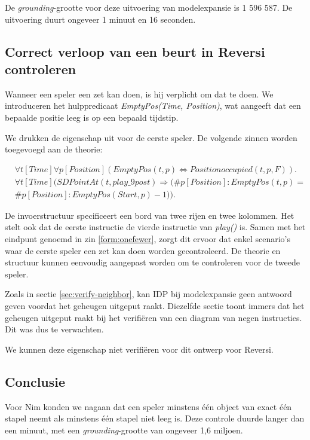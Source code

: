 De \textit{grounding}-grootte voor deze uitvoering van modelexpansie is 1 596 587. De uitvoering duurt ongeveer 1 minuut en 16 seconden. 

\subsection{Correct verloop van een beurt in Reversi controleren}

Wanneer een speler een zet kan doen, is hij verplicht om dat te doen. We introduceren het hulppredicaat \textit{EmptyPos(Time, Position)}, wat aangeeft dat een bepaalde positie leeg is op een bepaald tijdstip.

We drukken de eigenschap uit voor de eerste speler. De volgende zinnen worden toegevoegd aan de theorie:

\begin{align}
	&\forall{t}[Time]\forall{p}[Position](EmptyPos(t, p) \Leftrightarrow Positionoccupied(t, p, F)).\label{form:emptypos} \\
	\nonumber &\forall{t}[Time](SDPointAt(t, play\_9post) \Rightarrow (\#{p [Position] : EmptyPos(t, p)} = \\ &\#{p [Position] : EmptyPos(Start, p)} - 1)).\label{form:onefewer}
\end{align}

De invoerstructuur specificeert een bord van twee rijen en twee kolommen. Het stelt ook dat de eerste instructie de vierde instructie van \textit{play()} is. Samen met het eindpunt genoemd in zin \ref{form:onefewer}, zorgt dit ervoor dat enkel scenario's waar de eerste speler een zet kan doen worden gecontroleerd. De theorie en structuur kunnen eenvoudig aangepast worden om te controleren voor de tweede speler.

Zoals in sectie \ref{sec:verify-neighbor}, kan IDP bij modelexpansie geen antwoord geven voordat het geheugen uitgeput raakt. Diezelfde sectie toont immers dat het geheugen uitgeput raakt bij het verifi\"eren van een diagram van negen instructies. Dit was dus te verwachten.

We kunnen deze eigenschap niet verifi\"eren voor dit ontwerp voor Reversi.

\subsection{Conclusie}

Voor Nim konden we nagaan dat een speler minstens \'e\'en object van exact \'e\'en stapel neemt als minstens \'e\'en stapel niet leeg is. Deze controle duurde langer dan een minuut, met een \textit{grounding}-grootte van ongeveer 1,6 miljoen.

